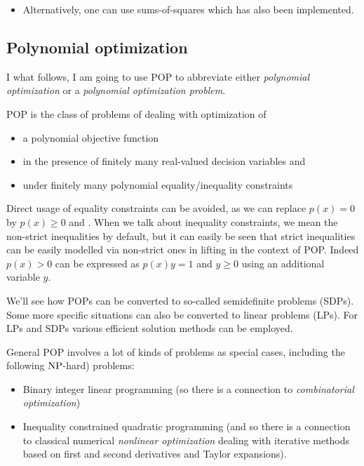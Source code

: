 \begin{itemize}
\begin{itemize}
    \item Alternatively, one can use sums-of-squares which has also been implemented.
    \end{itemize}
\end{itemize}
	
\subsection{Polynomial optimization}

I what follows, I am going to use POP to abbreviate either \emph{polynomial optimization} or a \emph{polynomial optimization problem}. 

POP is the class of problems of dealing with optimization of
\begin{itemize}
	\item a polynomial objective function 
	\item in the presence of finitely many real-valued decision variables and 
	\item under finitely many polynomial equality/inequality constraints
\end{itemize}

Direct usage of equality constraints can be avoided, as we can replace $p(x)=0$ by $p(x) \ge 0$ and . When we talk about inequality constraints, we mean the non-strict inequalities by default, but it can easily be seen that strict inequalities can be easily modelled via non-strict ones in lifting in the context of POP. Indeed $p(x) >0$ can be expressed as $p(x) y = 1$ and $y \ge 0$ using an additional variable $y$. 

We'll see how POPs can be converted to so-called semidefinite problems (SDPs). Some more specific situations can also be converted to linear problems (LPs). For LPs and SDPs various efficient solution methods can be employed. 

General POP involves a lot of kinds of problems as special cases, including the following $\operatorname{NP}$-hard) problems:
\begin{itemize}
	\item Binary integer linear programming (so there is a connection to \emph{combinatorial optimization})
	\item Inequality constrained quadratic programming (and so there is a connection to classical numerical \emph{nonlinear optimization} dealing with iterative methods based on first and second derivatives and Taylor expansions). 
\end{itemize}

